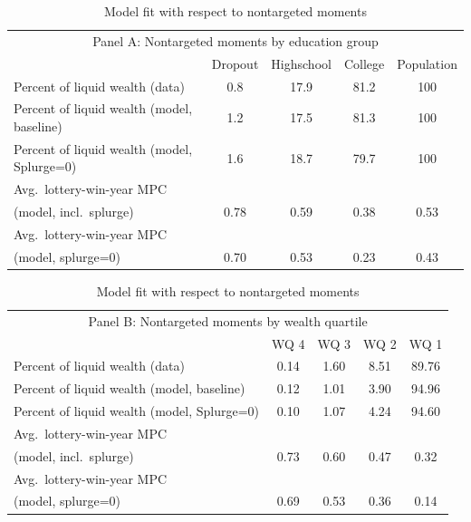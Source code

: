 \documentclass{econsocart}
\begin{document}
\begin{table}[tb] 
  \caption{\pregenmark Model fit with respect to nontargeted moments}
  \label{tab:nonTargetedMoments-wSplZero} %
  \centering

  \begin{tabular*}
    {\textwidth}{@{\extracolsep{\fill}}lcccc@{}}
    \multicolumn{5}{c}{\small Panel A: Nontargeted moments by education group} \\
    \addlinespace
    \hline
    & Dropout & Highschool & College & Population \\ \hline
    Percent of liquid wealth (data)             & 0.8  & 17.9 & 81.2 & 100 \\
    Percent of liquid wealth (model, baseline)  & 1.2  & 17.5 & 81.3 & 100 \\
    Percent of liquid wealth (model, Splurge=0) & 1.6  & 18.7 & 79.7 & 100 \\
    \addlinespace
    Avg.\ lottery-win-year MPC \\ \quad (model, incl.\ splurge) & 0.78 & 0.59 & 0.38 & 0.53 \\
    Avg.\ lottery-win-year MPC \\ \quad (model, splurge=0)     & 0.70 & 0.53 & 0.23 & 0.43 \\
    \hline
  \end{tabular*}

  \vspace{0.5em}

  \begin{tabular*}
    {\textwidth}{@{\extracolsep{\fill}}lcccc@{}}
    \multicolumn{5}{c}{\small Panel B: Nontargeted moments by wealth quartile} \\
    \addlinespace
    \hline
    & WQ 4 & WQ 3 & WQ 2 & WQ 1 \\ \hline
    Percent of liquid wealth (data)             & 0.14 & 1.60 & 8.51 & 89.76 \\
    Percent of liquid wealth (model, baseline)  & 0.12 & 1.01 & 3.90 & 94.96 \\
    Percent of liquid wealth (model, Splurge=0) & 0.10 & 1.07 & 4.24 & 94.60 \\
    \addlinespace
    Avg.\ lottery-win-year MPC \\ \quad (model, incl.\ splurge) & 0.73 & 0.60 & 0.47 & 0.32 \\
    Avg.\ lottery-win-year MPC \\ \quad (model, splurge=0)     & 0.69 & 0.53 & 0.36 & 0.14 \\
    \hline
  \end{tabular*}


\end{table}
\end{document}
